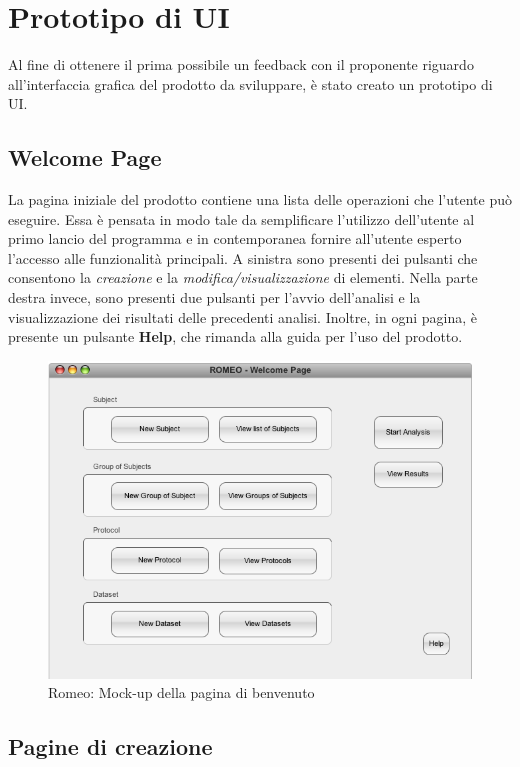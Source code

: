 \section{Prototipo di UI}
\label{ui}
Al fine di ottenere il prima possibile un feedback con il proponente riguardo all'interfaccia grafica del prodotto da sviluppare, è stato creato un prototipo di UI\glossario{}.

\subsection{Welcome Page}
La pagina iniziale del prodotto contiene una lista delle operazioni che l'utente può eseguire. Essa è pensata in modo tale da semplificare l'utilizzo dell'utente al primo lancio del programma e in contemporanea fornire all'utente esperto l'accesso alle funzionalità principali. A sinistra sono presenti dei pulsanti che consentono la \textit{creazione} e la \textit{modifica/visualizzazione} di elementi. Nella parte destra invece, sono presenti due pulsanti per l'avvio dell'analisi e la visualizzazione dei risultati delle precedenti analisi.
Inoltre, in ogni pagina, è presente un pulsante \textbf{Help}, che rimanda alla guida per l'uso del prodotto.
\begin{figure}[!h]
	\centering
	\includegraphics[width=0.8\linewidth]{./Content/Immagini/Prototype-v0.1/filesystemdoc_8_1}
	\caption{Romeo: Mock-up della pagina di benvenuto}
	\label{welcome_pages}
\end{figure}
\pagebreak
\subsection{Pagine di creazione}

